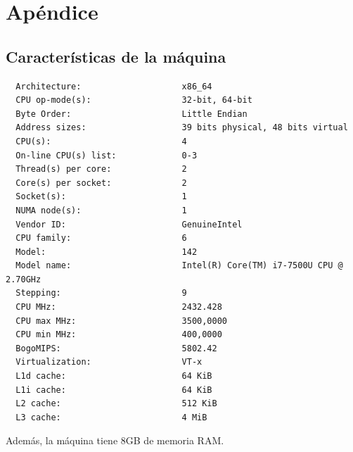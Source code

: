 \documentclass[11pt]{article}
\begin{document}
\pagebreak
\section{Apéndice} \label{apendice}

\subsection{Características de la máquina}

\begin{lstlisting}
  Architecture:                    x86_64
  CPU op-mode(s):                  32-bit, 64-bit
  Byte Order:                      Little Endian
  Address sizes:                   39 bits physical, 48 bits virtual
  CPU(s):                          4
  On-line CPU(s) list:             0-3
  Thread(s) per core:              2
  Core(s) per socket:              2
  Socket(s):                       1
  NUMA node(s):                    1
  Vendor ID:                       GenuineIntel
  CPU family:                      6
  Model:                           142
  Model name:                      Intel(R) Core(TM) i7-7500U CPU @ 2.70GHz
  Stepping:                        9
  CPU MHz:                         2432.428
  CPU max MHz:                     3500,0000
  CPU min MHz:                     400,0000
  BogoMIPS:                        5802.42
  Virtualization:                  VT-x
  L1d cache:                       64 KiB
  L1i cache:                       64 KiB
  L2 cache:                        512 KiB
  L3 cache:                        4 MiB
  \end{lstlisting}

Además, la máquina tiene 8GB de memoria RAM.

\pagebreak


\end{document}
